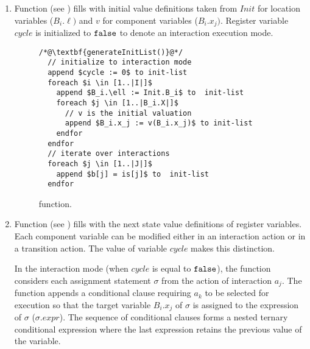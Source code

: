 \begin{enumerate}
\begin{figure}
\begin{lstlisting}
  // iterate over components
  foreach $i \in [1..|I|]$ 
    // iterate over component ports
    foreach $j \in [1..|B_i.P|]$ 
      append $B_i.p_j.s := \bigvee_{a_k \in interactions(B_i.p_j)} is[k]$ to  wiredef-list 
    endfor
  endfor
\end{lstlisting}
\caption{ function.}
\label{fig:generate-wire-list}
\end{figure}

\item Function  (see ) fills  with initial value definitions taken from $\mathit{Init}$ for location variables ($B_i.\ell)$ and $v$ for component variables ($B_i.x_j)$.
Register variable $\mathit{cycle}$ is initialized to $\mathtt{false}$ to denote an interaction execution mode. 

\begin{figure}
\begin{lstlisting}
/*@\textbf{generateInitList()}@*/
  // initialize to interaction mode
  append $cycle := 0$ to init-list 
  foreach $i \in [1..|I|]$
    append $B_i.\ell := Init.B_i$ to  init-list 
    foreach $j \in [1..|B_i.X|]$
      // v is the initial valuation
      append $B_i.x_j := v(B_i.x_j)$ to init-list  
    endfor
  endfor
  // iterate over interactions
  foreach $j \in [1..|J|]$ 
    append $b[j] = is[j]$ to  init-list 
  endfor
\end{lstlisting}
\caption{ function.}
\label{fig:generate-init-list}
\end{figure}

\item Function  (see ) fills  with the next state value definitions of register variables.
Each component variable can be modified either in an interaction action or in a transition action.
The value of variable $\mathit{cycle}$ makes this distinction. 

In the interaction mode (when $\mathit{cycle}$ is equal to $\mathtt{false}$), the function considers each assignment statement $\sigma$ from the action of interaction $a_j$.
The function appends a conditional clause requiring $a_k$ to be selected for execution so that the target variable $B_i.x_j$ of $\sigma$ is assigned to the expression of $\sigma$ ($\sigma.\mathit{expr}$). 
The sequence of conditional clauses forms a nested ternary conditional expression where the last expression retains the previous value of the variable. 


\end{enumerate}
